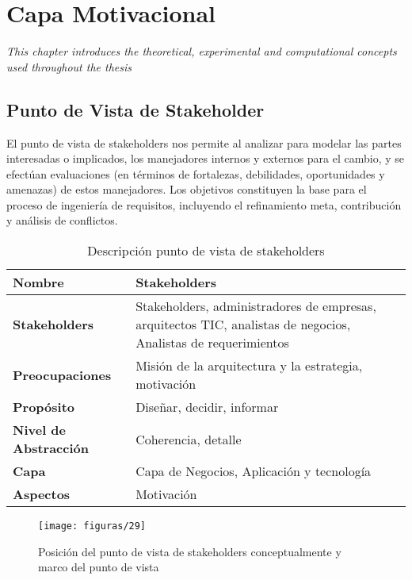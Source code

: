 \chapter{Capa Motivacional}
\label{chap:Motivacional}
\textit{This chapter introduces the theoretical, experimental and computational concepts used throughout the thesis}
\vspace{2ex}\vfill
\minitoc
\newpage

\section{Punto de Vista de Stakeholder}
El punto de vista de stakeholders nos permite al analizar para modelar las partes interesadas o implicados, los manejadores internos y externos para el cambio, y se efectúan evaluaciones (en términos de fortalezas, debilidades, oportunidades y amenazas) de estos manejadores. Los objetivos constituyen la base para el proceso de ingeniería de requisitos, incluyendo el refinamiento meta, contribución y análisis de conflictos.
    
  \begin{table}[H]
  	\centering
   	\begin{tabular}{lp{8cm}}
   		\toprule
   		\textbf{Nombre} & \textbf{Stakeholders} \\
   		\midrule
   		\textbf{Stakeholders} & Stakeholders, administradores de empresas, arquitectos TIC, analistas de negocios, Analistas de requerimientos \\
   		\textbf{Preocupaciones} & Misión de la arquitectura y la estrategia, motivación \\
   		\textbf{Propósito} & Diseñar, decidir, informar \\
   		\textbf{Nivel de Abstracción} & Coherencia, detalle \\
   		\textbf{Capa} & Capa de Negocios, Aplicación y tecnología \\
   		\textbf{Aspectos} & Motivación \\
   		\bottomrule
   	\end{tabular}
   	\captionsetup{width=.95\textwidth}
   	\caption{Descripción punto de vista de stakeholders}
   	\label{tabla20}
  \end{table}
    
  \begin{figure}[H]
   	\centering
   	\texttt{[image: figuras/29]}
   	\captionsetup{width=.95\textwidth}
   	\caption{Posición del punto de vista de stakeholders conceptualmente y marco del punto de vista}
   	\label{figura29}
   \end{figure}
   
